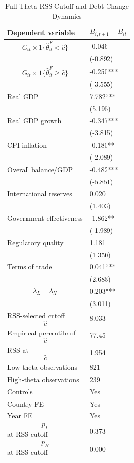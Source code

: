 \begin{table}[H]\centering
\begin{threeparttable}
\caption{Full-Theta RSS Cutoff and Debt-Change Dynamics}
\label{tab:deltaB_rss_cutoff_fulltheta}
\scriptsize
\begin{tabularx}{\textwidth}{lY}
\toprule
Dependent variable & $$B_{i,t+1}-B_{it}$$ \\
\midrule
$$G_{it}\times 1\{\widehat{\theta}^{F}_{it}<\widehat{c}\}$$ & -0.046 \\
 & (-0.892) \\
$$G_{it}\times 1\{\widehat{\theta}^{F}_{it}\geq\widehat{c}\}$$ & -0.250*** \\
 & (-3.555) \\
Real GDP & 7.782*** \\
 & (5.195) \\
Real GDP growth & -0.347*** \\
 & (-3.815) \\
CPI inflation & -0.180** \\
 & (-2.089) \\
Overall balance/GDP & -0.482*** \\
 & (-5.851) \\
International reserves & 0.020 \\
 & (1.403) \\
Government effectiveness & -1.862** \\
 & (-1.989) \\
Regulatory quality & 1.181 \\
 & (1.350) \\
Terms of trade & 0.041*** \\
 & (2.688) \\
$$\lambda_L-\lambda_H$$ & 0.203*** \\
 & (3.011) \\
\midrule
RSS-selected cutoff $$\widehat{c}$$ & 8.033 \\
Empirical percentile of $$\widehat{c}$$ & 77.45 \\
RSS at $$\widehat{c}$$ & 1.954 \\
Low-theta observations & 821 \\
High-theta observations & 239 \\
Controls & Yes \\
Country FE & Yes \\
Year FE & Yes \\
$$p_L$$ at RSS cutoff & 0.373 \\
$$p_H$$ at RSS cutoff & 0.000 \\

\end{tabularx}
\end{threeparttable}
\end{table}
